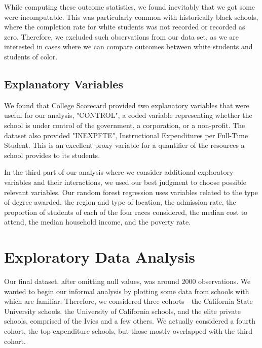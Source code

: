 \documentclass{article}
\begin{document}
While computing these outcome statistics, we found inevitably that we got some were incomputable. This was particularly common with historically black schools, where the completion rate for white students was not recorded or recorded as zero. Therefore, we excluded such observations from our data set, as we are interested in cases where we can compare outcomes between white students and students of color.

\subsection{Explanatory Variables}

We found that College Scorecard provided two explanatory variables that were useful for our analysis, "CONTROL", a coded variable representing whether the school is under control of the government, a corporation, or a non-profit. The dataset also provided "INEXPFTE", Instructional Expenditures per Full-Time Student. This is an excellent proxy variable for a quantifier of the resources a school provides to its students.

In the third part of our analysis where we consider additional exploratory variables and their interactions, we used our best judgment to choose possible relevant variables. Our random forest regression uses variables related to the type of degree awarded, the region and type of location, the admission rate, the proportion of students of each of the four races considered, the median cost to attend, the median household income, and the poverty rate.




\section{Exploratory Data Analysis}

Our final dataset, after omitting null values, was around 2000 observations. We wanted to begin our informal analysis by plotting some data from schools with which are familiar. Therefore, we considered three cohorts - the California State University schools, the University of California schools, and the elite private schools, comprised of the Ivies and a few others. We actually considered a fourth cohort, the top-expenditure schools, but those mostly overlapped with the third cohort.
\end{document}
